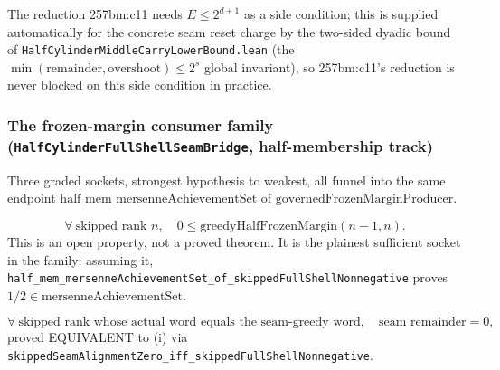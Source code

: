 \begin{prop}
The reduction 257bm:c11 needs $E\le2^{d+1}$ as a side condition; this is supplied automatically
for the concrete seam reset charge by the two-sided dyadic bound of \texttt{HalfCylinderMiddleCarryLowerBound.lean} (the $\min(\mathrm{remainder},\mathrm{overshoot})\le2^s$ global invariant), so 257bm:c11's reduction is never blocked on this side condition in practice.
\par\noindent{}   
\end{prop}

\subsubsection*{The frozen-margin consumer family (\texttt{HalfCylinderFullShellSeamBridge}, half-membership track)}

Three graded sockets, strongest hypothesis to weakest, all funnel into the same endpoint
$\mathrm{half\_mem\_mersenneAchievementSet\_of\_governedFrozenMarginProducer}$.

\begin{defn}
\[
\forall\ \text{skipped rank } n,\quad 0 \le \mathrm{greedyHalfFrozenMargin}(n-1,n).
\]
This is an open property, not a proved theorem. It is the plainest sufficient socket in the family:
assuming it, \texttt{half\_mem\_mersenneAchievementSet\_of\_skippedFullShellNonnegative} proves
$1/2\in\mathrm{mersenneAchievementSet}$.
\par\noindent{}    
\end{defn}

\begin{thm}
\[
\forall\ \text{skipped rank whose actual word equals the seam-greedy word},\quad \text{seam remainder} = 0,
\]
proved EQUIVALENT to (i) via \texttt{skippedSeamAlignmentZero\_iff\_skippedFullShellNonnegative}.
\par\noindent{}    
\end{thm}

